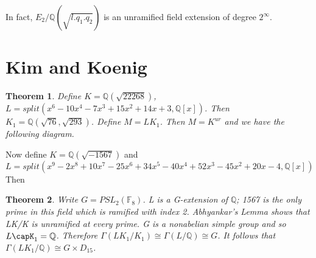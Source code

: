 \documentclass[preprint,12pt,reqno]{elsarticle}
\newtheorem{theorem}{Theorem}
\begin{document}
\begin{center}
\end{center}
\newline
In fact, $E_2/\mathbb{Q}(\sqrt{l.q_1.q_2})$ is an unramified field extension of degree $2^{\infty}$.
\section{Kim and Koenig}
\begin{theorem}
 Define $K=\mathbb{Q}(\sqrt{22268})$, $L=split(x^6-10x^4-7x^3+15x^2+14x+3,\mathbb{Q}[x])$. Then $K_1=\mathbb{Q}(\sqrt{76},\sqrt{293})$. Define $M=LK_1$. Then $M=K^{ur}$ and we have the following diagram.   
\end{theorem}
\begin{center}
\end{center}
Now define $K=\mathbb{Q}(\sqrt{-1567})$ and 
\begin{equation}
    L=split(x^9-2x^8+10x^7-25x^6+34x^5-40x^4+52x^3-45x^2+20x-4,\mathbb{Q}[x])
\end{equation}Then
\begin{theorem}
    Write $G=PSL_2(\mathbb{F}_8)$. L is a G-extension of $\mathbb{Q}$; 1567 is the only prime in this field which is ramified with index 2. Abhyankar's Lemma shows that LK/K is unramified at every prime. G is a nonabelian simple group and so $L\capK_1=\mathbb{Q}$. Therefore $\Gamma(LK_1/K_1)\cong\Gamma(L/\mathbb{Q})\cong G$. It follows that $\Gamma(LK_1/\mathbb{Q})\cong G\times D_{15}$.
\end{theorem}
\end{document}
